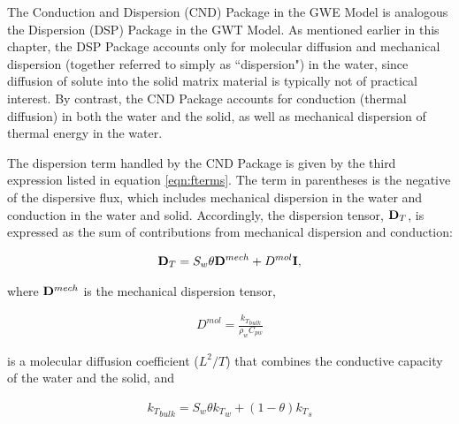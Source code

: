 The Conduction and Dispersion (CND) Package in the GWE Model is analogous the Dispersion (DSP) Package in the GWT Model. As mentioned earlier in this chapter, the DSP Package accounts only for molecular diffusion and mechanical dispersion (together referred to simply as ``dispersion") in the water, since diffusion of solute into the solid matrix material is typically not of practical interest.  By contrast, the CND Package accounts for conduction (thermal diffusion) in both the water and the solid, as well as mechanical dispersion of thermal energy in the water.

The dispersion term handled by the CND Package is given by the third expression listed in equation \ref{eqn:fterms}. The term in parentheses is the negative of the dispersive flux, which includes mechanical dispersion in the water and conduction in the water and solid. Accordingly, the dispersion tensor, $\mathbf{D}_T$, is expressed as the sum of contributions from mechanical dispersion and conduction:

\begin{equation}
\label{eqn:dt_tensor}
\begin{aligned}
\mathbf{D}_T = S_w \theta \mathbf{D}^{mech} + D^{mol} \mathbf{I},
\end{aligned}
\end{equation}

\noindent where $\mathbf{D}^{mech}$ is the mechanical dispersion tensor,

\begin{equation}
\label{eqn:dmolforheat}
\begin{aligned}
D^{mol} = \frac {{k_T}_{bulk}}{\rho_w C_{pw}}
\end{aligned}
\end{equation}

\noindent is a molecular diffusion coefficient ($L^2/T$) that combines the conductive capacity of the water and the solid, and

\begin{equation}
\label{eqn:ktbulk}
\begin{aligned}
{k_T}_{bulk} = S_w \theta {k_T}_w + \left ( 1 - \theta \right ) {k_T}_s
\end{aligned}
\end{equation}


